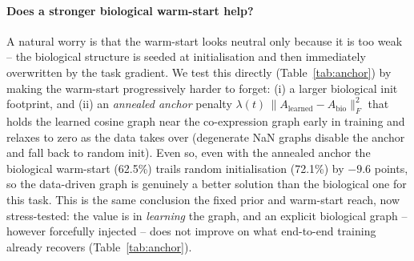 \documentclass[letterpaper]{article}
\begin{document}
\paragraph{Does a stronger biological warm-start help?}
A natural worry is that the warm-start looks neutral only because it is too weak -- the
biological structure is seeded at initialisation and then immediately overwritten by the
task gradient. We test this directly (Table~\ref{tab:anchor}) by making the warm-start
progressively harder to forget: (i) a larger biological init footprint, and (ii) an
\emph{annealed anchor} penalty $\lambda(t)\,\lVert A_{\text{learned}}-A_{\text{bio}}\rVert_F^2$
that holds the learned cosine graph near the co-expression graph early in training and
relaxes to zero as the data takes over (degenerate NaN graphs disable the anchor and fall
back to random init). Even so, even with the annealed anchor the biological warm-start (62.5\%) trails random initialisation (72.1\%) by $-9.6$ points, so the data-driven graph is genuinely a better solution than the biological one for this task. This is the same conclusion the fixed
prior and warm-start reach, now stress-tested: the value is in \emph{learning} the graph,
and an explicit biological graph -- however forcefully injected -- does not improve on what
end-to-end training already recovers (Table~\ref{tab:anchor}).
\end{document}
